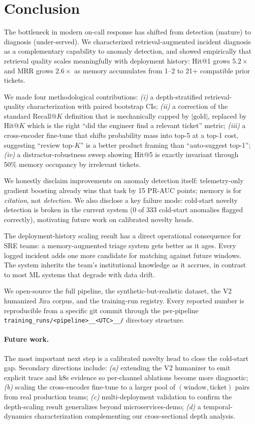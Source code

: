 \section{Conclusion}
\label{sec:conclusion}

The bottleneck in modern on-call response has shifted from detection (mature) to diagnosis (under-served). We characterized retrieval-augmented incident diagnosis as a complementary capability to anomaly detection, and showed empirically that retrieval quality scales meaningfully with deployment history: Hit@1 grows $5.2\times$ and MRR grows $2.6\times$ as memory accumulates from 1--2 to 21+ compatible prior tickets.

We made four methodological contributions: \emph{(i)} a depth-stratified retrieval-quality characterization with paired bootstrap CIs; \emph{(ii)} a correction of the standard Recall@$K$ definition that is mechanically capped by $|\text{gold}|$, replaced by Hit@$K$ which is the right ``did the engineer find a relevant ticket'' metric; \emph{(iii)} a cross-encoder fine-tune that shifts probability mass into top-5 at a top-1 cost, suggesting ``review top-$K$'' is a better product framing than ``auto-suggest top-1''; \emph{(iv)} a distractor-robustness sweep showing Hit@5 is exactly invariant through 50\% memory occupancy by irrelevant tickets.

We honestly disclaim improvements on anomaly detection itself: telemetry-only gradient boosting already wins that task by 15 PR-AUC points; memory is for \emph{citation}, not \emph{detection}. We also disclose a key failure mode: cold-start novelty detection is broken in the current system (0 of 333 cold-start anomalies flagged correctly), motivating future work on calibrated novelty heads.

The deployment-history scaling result has a direct operational consequence for SRE teams: a memory-augmented triage system gets better as it ages. Every logged incident adds one more candidate for matching against future windows. The system inherits the team's institutional knowledge as it accrues, in contrast to most ML systems that degrade with data drift.

We open-source the full pipeline, the synthetic-but-realistic dataset, the V2 humanized Jira corpus, and the training-run registry. Every reported number is reproducible from a specific git commit through the per-pipeline \texttt{training\_runs/<pipeline>\_\_<UTC>\_\_<sha8>/} directory structure.

\paragraph{Future work.} The most important next step is a calibrated novelty head to close the cold-start gap. Secondary directions include: \emph{(a)} extending the V2 humanizer to emit explicit trace and k8s evidence so per-channel ablations become more diagnostic; \emph{(b)} scaling the cross-encoder fine-tune to a larger pool of $(\text{window}, \text{ticket})$ pairs from real production teams; \emph{(c)} multi-deployment validation to confirm the depth-scaling result generalizes beyond microservices-demo; \emph{(d)} a temporal-dynamics characterization complementing our cross-sectional depth analysis.

